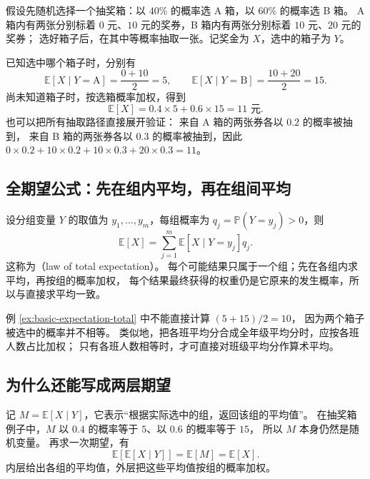 \documentclass[UTF8]{ctexart}
\begin{document}
\begin{example}
\label{ex:basic-expectation-total}
假设先随机选择一个抽奖箱：以 $40\%$ 的概率选 A 箱，以 $60\%$ 的概率选 B 箱。
A 箱内有两张分别标着 $0$ 元、$10$ 元的奖券，B 箱内有两张分别标着 $10$ 元、$20$ 元的奖券；
选好箱子后，在其中等概率抽取一张。记奖金为 $X$，选中的箱子为 $Y$。

已知选中哪个箱子时，分别有
\[
  \mathbb E[X\mid Y=\mathrm A]=\frac{0+10}{2}=5,\qquad
  \mathbb E[X\mid Y=\mathrm B]=\frac{10+20}{2}=15.
\]
尚未知道箱子时，按选箱概率加权，得到
\[
  \mathbb E[X]=0.4\times5+0.6\times15=11\text{ 元}.
\]
也可以把所有抽取路径直接展开验证：
来自 A 箱的两张券各以 $0.2$ 的概率被抽到，
来自 B 箱的两张券各以 $0.3$ 的概率被抽到，因此
$0\times0.2+10\times0.2+10\times0.3+20\times0.3=11$。
\end{example}

\subsection{全期望公式：先在组内平均，再在组间平均}

设分组变量 $Y$ 的取值为 $y_1,\ldots,y_m$，每组概率为
$q_j=\mathbb P(Y=y_j)>0$，则
\begin{equation}
  \mathbb E[X]
  =\sum_{j=1}^{m}
    \mathbb E[X\mid Y=y_j]q_j.
  \label{eq:basic-expectation-total}
\end{equation}
这称为（law of total expectation）。
每个可能结果只属于一个组；先在各组内求平均，再按组的概率加权，
每个结果最终获得的权重仍是它原来的发生概率，所以与直接求平均一致。

例 \ref{ex:basic-expectation-total} 中不能直接计算 $(5+15)/2=10$，
因为两个箱子被选中的概率并不相等。
类似地，把各班平均分合成全年级平均分时，应按各班人数占比加权；
只有各班人数相等时，才可直接对班级平均分作算术平均。

\subsection{为什么还能写成两层期望}

记 $M=\mathbb E[X\mid Y]$，它表示“根据实际选中的组，返回该组的平均值”。
在抽奖箱例子中，$M$ 以 $0.4$ 的概率等于 $5$、以 $0.6$ 的概率等于 $15$，
所以 $M$ 本身仍然是随机变量。
再求一次期望，有
\begin{equation}
  \mathbb E[\mathbb E[X\mid Y]]
  =\mathbb E[M]
  =\mathbb E[X].
  \label{eq:basic-expectation-tower}
\end{equation}
内层给出各组的平均值，外层把这些平均值按组的概率加权。
\end{document}
